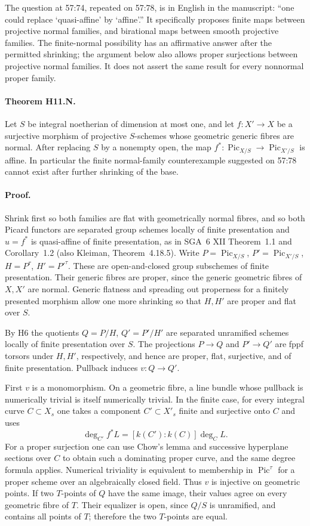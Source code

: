 The question at 57:74, repeated on 57:78, is in English in the manuscript:
``one could replace `quasi-affine' by `affine'.'' It specifically proposes
finite maps between projective normal families, and birational maps between
smooth projective families. The finite-normal possibility has an affirmative
answer after the permitted shrinking; the argument below also allows proper
surjections between projective normal families. It does not assert the same
result for every nonnormal proper family.

\paragraph{Theorem H11.N.}
Let $S$ be integral noetherian of dimension at most one, and let
$f:X'\to X$ be a surjective morphism of projective $S$-schemes whose geometric
generic fibres are normal. After replacing $S$ by a nonempty open, the map
$f^*:\operatorname{Pic}_{X/S}\to\operatorname{Pic}_{X'/S}$ is affine.
In particular the finite normal-family counterexample suggested on 57:78
cannot exist after further shrinking of the base.

\paragraph{Proof.}
Shrink first so both families are flat with geometrically normal fibres,
and so both Picard functors are separated group schemes locally of finite
presentation and $u=f^*$ is quasi-affine of finite presentation, as in
SGA~6 XII Theorem~1.1 and Corollary~1.2 (also Kleiman, Theorem~4.18.5).
Write $P=\operatorname{Pic}_{X/S}$, $P'=\operatorname{Pic}_{X'/S}$,
$H=P^\tau$, $H'=P'^\tau$. These are open-and-closed group subschemes of
finite presentation. Their generic fibres are proper, since the generic
geometric fibres of $X,X'$ are normal. Generic flatness and spreading out
properness for a finitely presented morphism allow one more shrinking so
that $H,H'$ are proper and flat over $S$.

By H6 the quotients $Q=P/H$, $Q'=P'/H'$ are separated unramified schemes
locally of finite presentation over $S$. The projections $P\to Q$ and
$P'\to Q'$ are fppf torsors under $H,H'$, respectively, and hence are proper,
flat, surjective, and of finite presentation. Pullback induces $v:Q\to Q'$.

First $v$ is a monomorphism. On a geometric fibre, a line bundle whose
pullback is numerically trivial is itself numerically trivial. In the finite
case, for every integral curve $C\subset X_s$ one takes a component
$C'\subset X'_s$ finite and surjective onto $C$ and uses
\[
 \deg_{C'}f^*L=[k(C'):k(C)]\deg_C L.
\]
For a proper surjection one can use Chow's lemma and successive hyperplane
sections over $C$ to obtain such a dominating proper curve, and the same
degree formula applies. Numerical triviality is equivalent to membership
in $\operatorname{Pic}^\tau$ for a proper scheme over an algebraically closed
field. Thus $v$ is injective on geometric points. If two $T$-points of $Q$
have the same image, their values agree on every geometric fibre of $T$.
Their equalizer is open, since $Q/S$ is unramified, and contains all points
of $T$; therefore the two $T$-points are equal.

